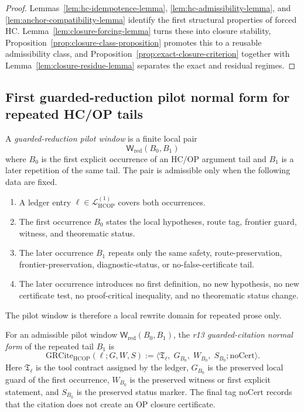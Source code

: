 \begin{proof}
Lemmas~\ref{lem:hc-idempotence-lemma},
\ref{lem:hc-admissibility-lemma}, and
\ref{lem:anchor-compatibility-lemma} identify the first structural properties of
forced HC. Lemma~\ref{lem:closure-forcing-lemma} turns these into closure
stability, Proposition~\ref{prop:closure-class-proposition} promotes this to a
reusable admissibility class, and
Proposition~\ref{prop:exact-closure-criterion} together with
Lemma~\ref{lem:closure-residue-lemma} separates the exact and residual regimes.
\end{proof}



\subsection{First guarded-reduction pilot normal form for repeated HC/OP tails}
\label{subsec:first-guarded-reduction-pilot-normal-form-repeated-hcop-tails}

\begin{definition}
\label{def:guarded-reduction-pilot-window}
A \emph{guarded-reduction pilot window} is a finite local pair
\[
  \mathsf W_{\mathrm{red}}(B_0,B_1)
\]
where \(B_0\) is the first explicit occurrence of an HC/OP argument tail and \(B_1\) is a later repetition of the same tail. The pair is admissible only when the following data are fixed.
\begin{enumerate}[leftmargin=2em,label=(\roman*)]
  \item A ledger entry \(\ell\in\mathcal L_{\mathrm{HCOP}}^{(1)}\) covers both occurrences.
  \item The first occurrence \(B_0\) states the local hypotheses, route tag, frontier guard, witness, and theorematic status.
  \item The later occurrence \(B_1\) repeats only the same safety, route-preservation, frontier-preservation, diagnostic-status, or no-false-certificate tail.
  \item The later occurrence introduces no first definition, no new hypothesis, no new certificate test, no proof-critical inequality, and no theorematic status change.
\end{enumerate}
The pilot window is therefore a local rewrite domain for repeated prose only.
\end{definition}

\begin{definition}
\label{def:r13-guarded-citation-normal-form}
For an admissible pilot window \(\mathsf W_{\mathrm{red}}(B_0,B_1)\), the \emph{r13 guarded-citation normal form} of the repeated tail \(B_1\) is
\[
  \mathrm{GRCite}_{\mathrm{HCOP}}(\ell;G,W,S)
  :=
  \bigl\langle
    \mathfrak T_{\ell},\;G_{B_0},\;W_{B_0},\;S_{B_0};\mathrm{noCert}
  \bigr\rangle .
\]
Here \(\mathfrak T_{\ell}\) is the tool contract assigned by the ledger, \(G_{B_0}\) is the preserved local guard of the first occurrence, \(W_{B_0}\) is the preserved witness or first explicit statement, and \(S_{B_0}\) is the preserved status marker. The final tag \(\mathrm{noCert}\) records that the citation does not create an OP closure certificate.
\end{definition}

